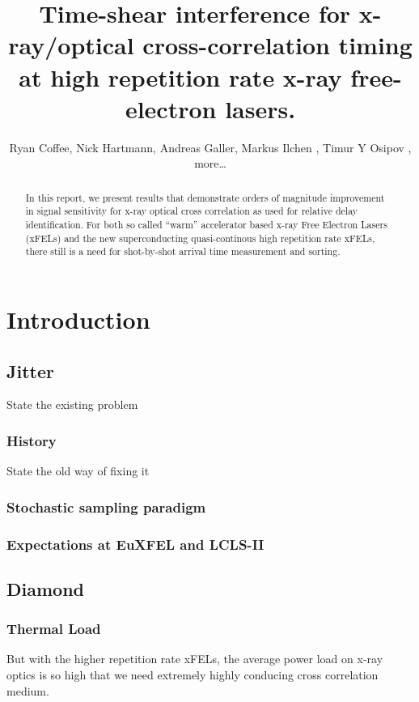 \documentclass{article}
\begin{document}
\author{Ryan Coffee, Nick Hartmann, Andreas Galler, Markus Ilchen
, Timur Y Osipov
, more\ldots}

\title{Time-shear interference for x-ray/optical cross-correlation timing at high repetition rate x-ray free-electron lasers.}

\begin{abstract}
In this report, we present results that demonstrate orders of magnitude improvement in signal sensitivity for x-ray optical cross correlation as used for relative delay identification.
For both so called ``warm'' accelerator based x-ray Free Electron Lasers (xFELs) and the new superconducting quasi-continous high repetition rate xFELs, there still is a need for shot-by-shot arrival time measurement and sorting.
\end{abstract}

\maketitle


\section{Introduction}
\subsection{Jitter}
State the existing problem
\subsubsection{History}
State the old way of fixing it
\subsubsection{Stochastic sampling paradigm}
\subsubsection{Expectations at EuXFEL and LCLS-II}
\subsection{Diamond}
\subsubsection{Thermal Load}
	But with the higher repetition rate xFELs, the average power load on x-ray optics is so high that we need extremely highly conducing cross correlation medium.
\end{document}
